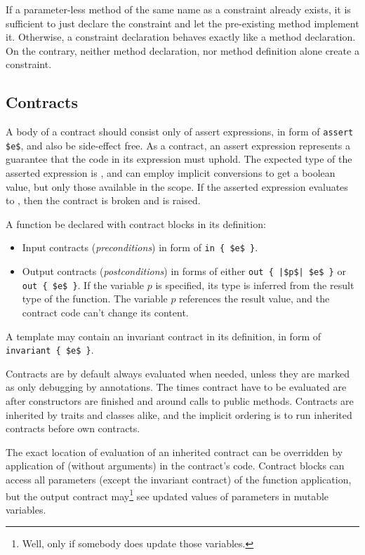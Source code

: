 If a parameter-less method of the same name as a constraint already exists, it is sufficient to just declare the constraint and let the pre-existing method implement it. Otherwise, a constraint declaration behaves exactly like a method declaration. On the contrary, neither method declaration, nor method definition alone create a constraint. 





\subsection{Contracts}

A body of a contract should consist only of assert expressions, in form of \lstinline!assert $e$!, and also be side-effect free. As a contract, an assert expression represents a guarantee that the code in its expression must uphold. The expected type of the asserted expression is , and can employ implicit conversions to get a boolean value, but only those available in the scope. If the asserted expression evaluates to , then the contract is broken and  is raised. 

A function be declared with contract blocks in its definition:
\begin{itemize}
  \item Input contracts ({\em preconditions}) in form of \lstinline!in { $e$ }!.
  \item Output contracts ({\em postconditions}) in forms of either \lstinline!out { |$p$| $e$ }! or \lstinline!out { $e$ }!. If the variable $p$ is specified, its type is inferred from the result type of the function. The variable $p$ references the result value, and the contract code can't change its content. 
\end{itemize}

A template may contain an invariant contract in its definition, in form of \lstinline!invariant { $e$ }!.

Contracts are by default always evaluated when needed, unless they are marked as only debugging by annotations. The times contract have to be evaluated are after constructors are finished and around calls to public methods. Contracts are inherited by traits and classes alike, and the implicit ordering is to run inherited contracts before own contracts. 

The exact location of evaluation of an inherited contract can be overridden by application of  (without arguments) in the contract's code. Contract blocks can access all parameters (except the invariant contract) of the function application, but the output contract may\footnote{Well, only if somebody does update those variables.} see updated values of parameters in mutable variables. 

